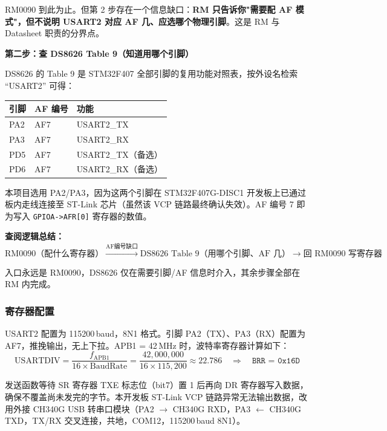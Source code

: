 \documentclass[12pt, a4paper]{ctexrep}
\begin{document}
RM0090 到此为止。但第 2 步存在一个信息缺口：\textbf{RM 只告诉你"需要配 AF 模式"，但不说明 USART2 对应 AF 几、应选哪个物理引脚}。这是 RM 与 Datasheet 职责的分界点。

\textbf{第二步：查 DS8626 Table 9（知道用哪个引脚）}

DS8626 的 Table 9 是 STM32F407 全部引脚的复用功能对照表，按外设名检索 ``USART2'' 可得：

\begin{center}
\begin{tabular}{lll}
    \toprule
    \textbf{引脚} & \textbf{AF 编号} & \textbf{功能} \\
    \midrule
    PA2 & AF7 & USART2\_TX \\
    PA3 & AF7 & USART2\_RX \\
    PD5 & AF7 & USART2\_TX（备选） \\
    PD6 & AF7 & USART2\_RX（备选） \\
    \bottomrule
\end{tabular}
\end{center}

本项目选用 PA2/PA3，因为这两个引脚在 STM32F407G-DISC1 开发板上已通过板内走线连接至 ST-Link 芯片（虽然该 VCP 链路最终确认失效）。AF 编号 7 即为写入 \texttt{GPIOA->AFR[0]} 寄存器的数值。

\textbf{查阅逻辑总结：}
\[
\text{RM0090（配什么寄存器）}
\xrightarrow{\text{AF编号缺口}}
\text{DS8626 Table 9（用哪个引脚、AF 几）}
\xrightarrow{}
\text{回 RM0090 写寄存器}
\]

入口永远是 RM0090，DS8626 仅在需要引脚/AF 信息时介入，其余步骤全部在 RM 内完成。

\subsubsection*{寄存器配置}

USART2 配置为 115200\,baud，8N1 格式。引脚 PA2（TX）、PA3（RX）配置为 AF7，推挽输出，无上下拉。APB1 = 42\,MHz 时，波特率寄存器计算如下：
\begin{equation}
    \text{USARTDIV} = \frac{f_{\text{APB1}}}{16 \times \text{BaudRate}}
    = \frac{42{,}000{,}000}{16 \times 115{,}200} \approx 22.786
    \quad\Rightarrow\quad \texttt{BRR = 0x16D}
\end{equation}

发送函数等待 SR 寄存器 TXE 标志位（bit7）置 1 后再向 DR 寄存器写入数据，确保不覆盖尚未发完的字节。本开发板 ST-Link VCP 链路异常无法输出数据，改用外接 CH340G USB 转串口模块（PA2 $\to$ CH340G RXD，PA3 $\leftarrow$ CH340G TXD，TX/RX 交叉连接，共地，COM12，115200\,baud 8N1）。
\end{document}
